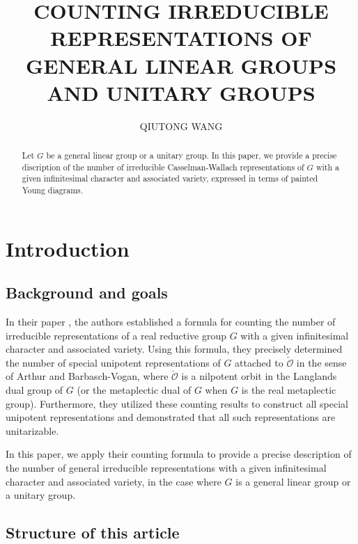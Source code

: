 \documentclass[12pt, a4paper]{amsart}
\author[QIUTONG WANG]{QIUTONG WANG}
\numberwithin{equation}{section}
\newcommand{\CO}{{\mathcal {O}}}
\begin{document}
\title[COUNTING IRREDUCIBLE REPRESENTATIONS]{COUNTING IRREDUCIBLE REPRESENTATIONS OF GENERAL LINEAR GROUPS AND UNITARY GROUPS}
\maketitle

\begin{abstract}
    Let $G$ be a general linear group or a unitary group. In this paper, we provide a precise discription of the number of irreducible Casselman-Wallach representations of $G$ with a given infinitesimal character and associated variety, expressed in terms of painted Young diagrams.
\end{abstract}

\tableofcontents



\section{Introduction}

\subsection{Background and goals}

In their paper \cite{BMSZ}, the authors established a formula for counting the number of irreducible representations of a real reductive group $G$ with a given infinitesimal character and associated variety. Using this formula, they precisely determined the number of special unipotent representations of $G$ attached to $\check{\CO}$ in the sense of Arthur and Barbasch-Vogan, where $\check{\CO}$ is a nilpotent orbit in the Langlands dual group of $G$ (or the metaplectic dual of $G$ when $G$ is the real metaplectic group). Furthermore, they utilized these counting results to construct all special unipotent representations and demonstrated that all such representations are unitarizable.

In this paper, we apply their counting formula to provide a precise description of the number of general irreducible representations with a given infinitesimal character and associated variety, in the case where $G$ is a general linear group or a unitary group.

\subsection{Structure of this article}
\end{document}
